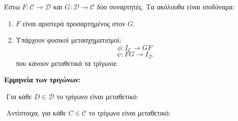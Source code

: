 \vspace*{0.3cm}
\begin{theorem} Έστω $F: \mathcal{C} \longrightarrow \mathcal{D}$ και $G : \mathcal{D}\longrightarrow \mathcal{C}$ δύο συναρτητές. Τα ακόλουθα είναι ισοδύναμα:
    \begin{enumerate}
        \item $F$ είναι αριστερά προσαρτημένος στον $G$.
        \item Υπάρχουν φυσικοί μετασχηματισμοί: 
        $$\phi: I_{\mathcal{C}} \longrightarrow GF$$
        $$\psi : FG\longrightarrow I_{\mathcal{D}}$$ που κάνουν μεταθετικά τα τρίγωνα:
    \end{enumerate}
\end{theorem}
\begin{figure}[H]
    \centering
\end{figure}

\vspace*{0.3cm}
\noindent \textbf{Ερμηνεία των τριγώνων:}

$ $\newline
Για κάθε $D \in \mathcal{D}$ το τρίγωνο είναι μεταθετικό:
\begin{figure}[H]
    \centering
\end{figure}

$ $\newline
Αντίστοιχα, για κάθε $C \in \mathcal{C}$ το τρίγωνο είναι μεταθετικό:
\begin{figure}[H] 
    \centering
\end{figure}

